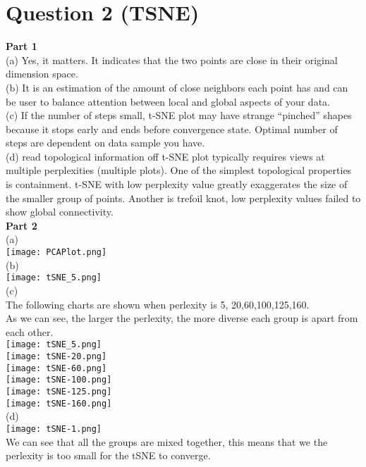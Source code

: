 \documentclass{article}
\begin{document}
\section{Question 2 (TSNE)}
\textbf{Part 1} \\
(a) Yes, it matters. It indicates that the two points are close in their original dimension space. \\
(b) It is an estimation of the amount of close neighbors each point has and can be user to balance attention between local and global aspects of your data. \\
(c) If the number of steps small, t-SNE plot may have  strange “pinched” shapes because it stops early and ends before convergence state. Optimal number of steps are dependent on data sample you have. \\
(d) read topological information off t-SNE plot typically requires views at multiple perplexities (multiple plots). One of the simplest topological properties is containment. t-SNE with low perplexity value greatly exaggerates the size of the smaller group of points. Another is trefoil knot, low perplexity values failed to show global connectivity.\\ 
\textbf{Part 2} \\
(a)\\
\texttt{[image: PCAPlot.png]}\\
(b)\\ 
\texttt{[image: tSNE\_5.png]}\\
(c) \\ 
The following charts are shown when perlexity is 5, 20,60,100,125,160. \\
As we can see, the larger the perlexity, the more diverse each group is apart from each other. \\
\texttt{[image: tSNE\_5.png]}\\
\texttt{[image: tSNE-20.png]}\\
\texttt{[image: tSNE-60.png]}\\
\texttt{[image: tSNE-100.png]}\\
\texttt{[image: tSNE-125.png]}\\
\texttt{[image: tSNE-160.png]}\\
(d) \\ 
\texttt{[image: tSNE-1.png]}\\
We can see that all the groups are mixed together, this means that we the perlexity is too small for the tSNE to converge. 
\end{document}

